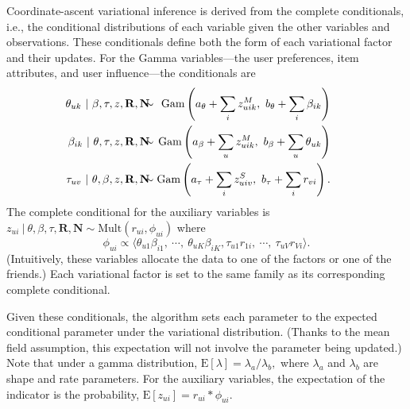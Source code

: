 \documentclass{sig-alternate-2013}
\newcommand{\E}{\mathrm{E}}
\begin{document}
Coordinate-ascent variational inference is derived from the complete
conditionals, i.e., the conditional distributions of each variable
given the other variables and observations.  These conditionals define
both the form of each variational factor and their updates.  For the
Gamma variables---the user preferences, item attributes, and user
influence---the conditionals are {\small
\begin{eqnarray}
  \hspace{-15px}\textstyle \theta_{uk} ~\vert~ \beta, \tau, z, \mathbf{R}, \mathbf{N}&\hspace{-7px}\sim&\hspace{-7px}
  	\textrm{Gam}\left(a_\theta + \sum_{i} z_{uik}^M ,~
  	b_\theta+ \sum_{i}\beta_{ik} \right) \label{eq:thetaCC}\\
  \hspace{-15px}\textstyle \beta_{ik} ~\vert~ \theta, \tau, z, \mathbf{R}, \mathbf{N}&\hspace{-7px}\sim&\hspace{-7px}
  	\textrm{Gam}\left(a_\beta + \sum_u z_{uik}^M ,~
  	b_\beta+ \sum_u\theta_{uk} \right) \label{eq:betaCC} \\
  \hspace{-15px}\textstyle \tau_{uv} ~\vert~ \theta, \beta, z, \mathbf{R}, \mathbf{N}&\hspace{-7px}\sim&\hspace{-7px}
  	\textrm{Gam}\left(a_\tau + \sum_{i} z_{uiv}^S,~
	b_\tau+ \sum_{i} r_{vi} \right).
	\label{eq:tauCC}
\end{eqnarray}
}The complete conditional for the auxiliary variables is \\
\noindent$z_{ui} ~\vert~ \theta, \beta, \tau, \mathbf{R}, \mathbf{N} \sim
\mbox{Mult}\left(r_{ui}, \phi_{ui}\right)$ where
\begin{equation}
\phi_{ui} \propto \bigg\langle \theta_{u1}\beta_{i1},~\cdots, ~\theta_{uK}\beta_{iK},
  \tau_{u1}r_{1i},~\cdots,~ \tau_{uV}r_{Vi}
      \bigg\rangle.
\label{eq:phi}
\end{equation}
(Intuitively, these variables allocate the data to one of the factors
or one of the friends.)  Each variational factor is set to the same
family as its corresponding complete conditional.

Given these conditionals, the algorithm sets each parameter to the
expected conditional parameter under the variational distribution.
(Thanks to the mean field assumption, this expectation will not
involve the parameter being updated.)  Note that under a gamma
distribution, $\E[\lambda] = \lambda_a / \lambda_b,$ where $\lambda_a$
and $\lambda_b$ are shape and rate parameters.  For the auxiliary
variables, the expectation of the indicator is the probability,
$\E[z_{ui}] = r_{ui} * \phi_{ui}$.
\end{document}
